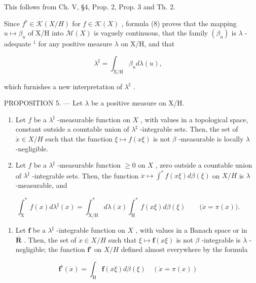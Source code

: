 This follows from Ch. V, §4, Prop. 2, Prop. 3 and Th. 2.

Since \(f^{\flat} \in \mathcal{K}(X/H)\) for \(f \in \mathcal{K}(X)\) , formula (8) proves that the mapping \(u \mapsto \beta_{u}\) of X/H into \(\mathcal{M}(X)\) is vaguely continuous, that the family \((\beta_{u})\) is \(\lambda\) -adequate \(^{1}\) for any positive measure \(\lambda\) on X/H, and that

\[
\lambda^ {\sharp} = \int_ {\mathrm{X/H}} \beta_ {u} d \lambda (u),\tag{10}
\]

which furnishes a new interpretation of \(\lambda^{\sharp}\) .

PROPOSITION 5. --- Let \(\lambda\) be a positive measure on X/H.

\begin{enumerate}
\def\labelenumi{\alph{enumi})}
\item
  Let \(f\) be a \(\lambda^{\sharp}\) -measurable function on \(X\) , with values in a topological space, constant outside a countable union of \(\lambda^{\sharp}\) -integrable sets. Then, the set of \(\dot{x} \in X / H\) such that the function \(\xi \mapsto f(x\xi)\) is not \(\beta\) -measurable is locally \(\lambda\) -negligible.
\item
  Let \(f\) be a \(\lambda^{\sharp}\) -measurable function \(\geqslant 0\) on \(X\) , zero outside a countable union of \(\lambda^{\sharp}\) -integrable sets. Then, the function \(\dot{x} \mapsto \int^{*} f(x\xi) d\beta(\xi)\) on \(X / H\) is \(\lambda\) -measurable, and
\end{enumerate}

\[
\int_ {\mathrm{X}} ^ {*} f (x) d \lambda^ {\sharp} (x) = \int_ {\mathrm{X/H}} ^ {*} d \lambda (\dot {x}) \int_ {\mathrm{H}} ^ {*} f (x \xi) d \beta (\xi) \qquad \big (\dot {x} = \pi (x) \big).
\]

\begin{enumerate}
\def\labelenumi{\alph{enumi})}
\setcounter{enumi}{2}
\tightlist
\item
  Let \(\mathbf{f}\) be a \(\lambda^{\sharp}\) -integrable function on \(X\) , with values in a Banach space or in \(\overline{\mathbf{R}}\) . Then, the set of \(\dot{x} \in X / H\) such that \(\xi \mapsto \mathbf{f}(x\xi)\) is not \(\beta\) -integrable is \(\lambda\) -negligible; the function \(\mathbf{f}^{\flat}\) on \(X / H\) defined almost everywhere by the formula
\end{enumerate}

\[
\mathbf {f} ^ {\flat} (\dot {x}) = \int_ {\mathrm{H}} \mathbf {f} (x \xi) d \beta (\xi) \quad \left(\dot {x} = \pi (x)\right)\tag{11}
\]

